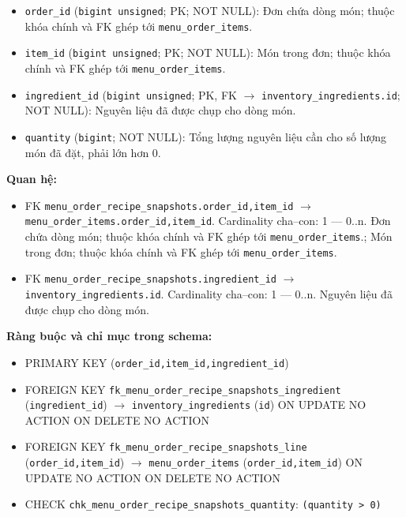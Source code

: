 \begin{itemize}

\item \texttt{order\_id} (\texttt{bigint unsigned}; PK; NOT NULL): Đơn chứa dòng món; thuộc khóa chính và FK ghép tới \texttt{menu\_order\_items}.

\item \texttt{item\_id} (\texttt{bigint unsigned}; PK; NOT NULL): Món trong đơn; thuộc khóa chính và FK ghép tới \texttt{menu\_order\_items}.

\item \texttt{ingredient\_id} (\texttt{bigint unsigned}; PK, FK $\rightarrow$ \texttt{inventory\_ingredients.id}; NOT NULL): Nguyên liệu đã được chụp cho dòng món.

\item \texttt{quantity} (\texttt{bigint}; NOT NULL): Tổng lượng nguyên liệu cần cho số lượng món đã đặt, phải lớn hơn 0.

\end{itemize}

\textbf{Quan hệ:}

\begin{itemize}

\item FK \texttt{menu\_order\_recipe\_snapshots.order\_id,item\_id} $\rightarrow$ \texttt{menu\_order\_items.order\_id,item\_id}. Cardinality cha--con: 1 — 0..n. Đơn chứa dòng món; thuộc khóa chính và FK ghép tới \texttt{menu\_order\_items}.; Món trong đơn; thuộc khóa chính và FK ghép tới \texttt{menu\_order\_items}.

\item FK \texttt{menu\_order\_recipe\_snapshots.ingredient\_id} $\rightarrow$ \texttt{inventory\_ingredients.id}. Cardinality cha--con: 1 — 0..n. Nguyên liệu đã được chụp cho dòng món.

\end{itemize}

\textbf{Ràng buộc và chỉ mục trong schema:}

\begin{itemize}

\item PRIMARY KEY (\texttt{order\_id,item\_id,ingredient\_id})

\item FOREIGN KEY \texttt{fk\_menu\_order\_recipe\_snapshots\_ingredient} (\texttt{ingredient\_id}) $\rightarrow$ \texttt{inventory\_ingredients} (\texttt{id}) ON UPDATE NO ACTION ON DELETE NO ACTION

\item FOREIGN KEY \texttt{fk\_menu\_order\_recipe\_snapshots\_line} (\texttt{order\_id,item\_id}) $\rightarrow$ \texttt{menu\_order\_items} (\texttt{order\_id,item\_id}) ON UPDATE NO ACTION ON DELETE NO ACTION

\item CHECK \texttt{chk\_menu\_order\_recipe\_snapshots\_quantity}: \texttt{(quantity > 0)}

\end{itemize}

